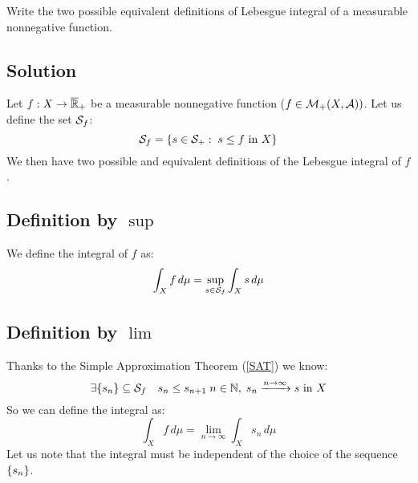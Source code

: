 

\question

Write the two possible equivalent definitions of Lebesgue integral of a measurable nonnegative function.

\subsection*{Solution}

Let $f:X\to\overline{\mathbb{R}}_{+}$ be a measurable nonnegative function ($f\in\mathcal{M}_+(X,\mathcal{A}))$. Let us define the set $\mathcal{S}_f$:
\[
    \mathcal{S}_f = \{ s\in \mathcal{S}_+ : \; s\leq f \text{ in } X\}    
\]
We then have two possible and equivalent definitions of the Lebesgue integral of $f$.

\subsection{Definition by \texorpdfstring{$\sup$}{the supremum}}
We define the integral of $f$ as:
\[
    \int_X f \,d\mu = \sup_{s\in\mathcal{S}_f} \int_X s \,d\mu
\]

\subsection{Definition by \texorpdfstring{$\lim$}{the limit}}
Thanks to the Simple Approximation Theorem (\ref{SAT}) we know:
\[
    \exists \{ s_n \} \subseteq \mathcal{S}_f \quad s_n\leq s_{n+1} \; n\in\mathbb{N}, \; s_n\xrightarrow{n\to\infty} s \text{ in } X
\]
So we can define the integral as:
\[
    \int_X f \,d\mu = \lim_{n\to\infty} \int_X s_n \,d\mu    
\]
Let us note that the integral must be independent of the choice of the sequence $\{ s_n \}$.